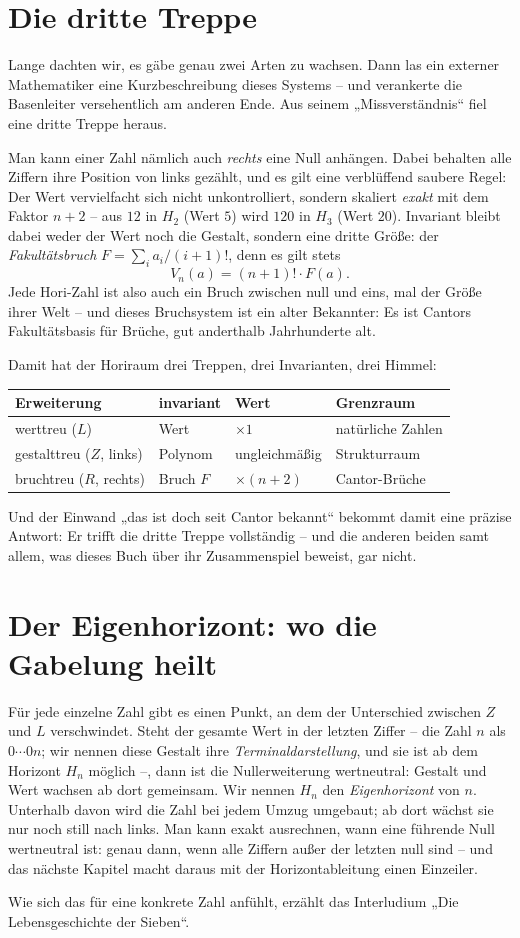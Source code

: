 \section{Die dritte Treppe}

Lange dachten wir, es gäbe genau zwei Arten zu wachsen. Dann las ein
externer Mathematiker eine Kurzbeschreibung dieses Systems -- und
verankerte die Basenleiter versehentlich am anderen Ende. Aus seinem
„Missverständnis“ fiel eine dritte Treppe heraus.

Man kann einer Zahl nämlich auch \emph{rechts} eine Null anhängen.
Dabei behalten alle Ziffern ihre Position von links gezählt, und es
gilt eine verblüffend saubere Regel: Der Wert vervielfacht sich
nicht unkontrolliert, sondern skaliert \emph{exakt} mit dem Faktor $n+2$ --
aus $12$ in $H_2$ (Wert $5$) wird $120$ in $H_3$ (Wert $20$).
Invariant bleibt dabei weder der Wert noch die Gestalt, sondern eine
dritte Größe: der \emph{Fakultätsbruch}
$F=\sum_i a_i/(i+1)!$, denn es gilt stets
\[
V_n(a)=(n+1)!\cdot F(a).
\]
Jede Hori-Zahl ist also auch ein Bruch zwischen null und eins, mal
der Größe ihrer Welt -- und dieses Bruchsystem ist ein alter
Bekannter: Es ist Cantors Fakultätsbasis für Brüche, gut
anderthalb Jahrhunderte alt.

Damit hat der Horiraum drei Treppen, drei Invarianten, drei Himmel:

\begin{center}
\begin{tabular}{l|lll}
Erweiterung & invariant & Wert & Grenzraum\\
\hline
werttreu ($L$) & Wert & $\times1$ & natürliche Zahlen\\
gestalttreu ($Z$, links) & Polynom & ungleichmäßig & Strukturraum\\
bruchtreu ($R$, rechts) & Bruch $F$ & $\times(n+2)$ & Cantor-Brüche\\
\end{tabular}
\end{center}

Und der Einwand „das ist doch seit Cantor bekannt“ bekommt damit
eine präzise Antwort: Er trifft die dritte Treppe vollständig -- und
die anderen beiden samt allem, was dieses Buch über ihr Zusammenspiel
beweist, gar nicht.

\section{Der Eigenhorizont: wo die Gabelung heilt}

Für jede einzelne Zahl gibt es einen Punkt, an dem der Unterschied
zwischen $Z$ und $L$ verschwindet. Steht der gesamte Wert in der
letzten Ziffer -- die Zahl $n$ als $0\cdots0n$; wir nennen diese
Gestalt ihre \emph{Terminaldarstellung}, und sie ist ab dem
Horizont $H_n$ möglich --, dann ist die Nullerweiterung wertneutral:
Gestalt und Wert wachsen ab dort gemeinsam. Wir nennen $H_n$ den
\emph{Eigenhorizont} von $n$. Unterhalb davon wird die Zahl bei
jedem Umzug umgebaut; ab dort wächst sie nur noch still nach links.
Man kann exakt ausrechnen, wann eine führende Null wertneutral ist:
genau dann, wenn alle Ziffern außer der letzten null sind -- und
das nächste Kapitel macht daraus mit der Horizontableitung einen
Einzeiler.

Wie sich das für eine konkrete Zahl anfühlt, erzählt das
Interludium „Die Lebensgeschichte der Sieben“.
